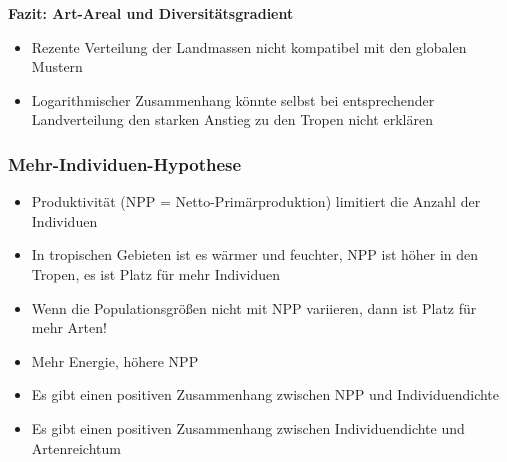 \textbf{Fazit: Art-Areal und Diversitätsgradient}
\begin{itemize}
	\item Rezente Verteilung der Landmassen nicht kompatibel mit den globalen Mustern
	\item Logarithmischer Zusammenhang könnte selbst bei entsprechender Landverteilung den starken Anstieg zu den Tropen nicht erklären
\end{itemize}

\subsubsection{Mehr-Individuen-Hypothese}
\begin{itemize}
	\item Produktivität (NPP = Netto-Primärproduktion) limitiert die Anzahl der Individuen
	\item In tropischen Gebieten ist es wärmer und feuchter, NPP ist höher in den Tropen, es ist Platz für mehr Individuen
	\item Wenn die Populationsgrößen nicht mit NPP variieren, dann ist Platz für mehr Arten!
\end{itemize}

\begin{itemize}
	\item Mehr Energie, höhere NPP
	\item Es gibt einen positiven Zusammenhang zwischen NPP und Individuendichte
	\item Es gibt einen positiven Zusammenhang zwischen Individuendichte und Artenreichtum
\end{itemize}

